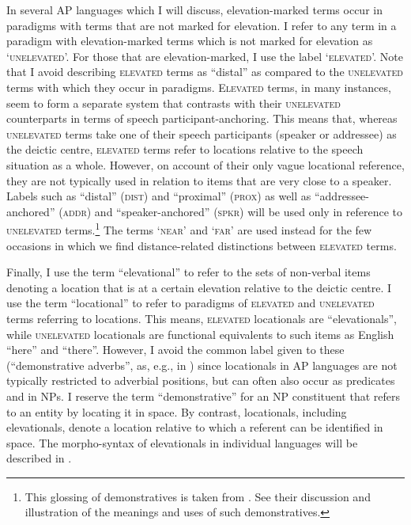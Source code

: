 In several AP languages which I will discuss, elevation-marked terms occur in paradigms with terms that are not marked for elevation. I refer to any term in a paradigm with elevation-marked terms which is not marked for elevation as `\textsc{unelevated}'. For those that are elevation-marked, I use the label `\textsc{elevated'.} Note that I avoid describing \textsc{elevated} terms as ``distal'' as compared to the \textsc{unelevated} terms with which they occur in paradigms. \textsc{Elevated} terms, in many instances, seem to form a separate system that contrasts with their \textsc{unelevated} counterparts in terms of speech participant-anchoring. This means that, whereas \textsc{unelevated} terms take one of their speech participants (speaker or addressee) as the deictic centre, \textsc{elevated} terms refer to locations relative to the speech situation as a whole. However, on account of their only vague locational reference, they are not typically used in relation to items that are very close to a speaker. Labels such as ``distal'' (\textsc{dist}) and ``proximal'' (\textsc{prox}) as well as ``addressee-anchored'' (\textsc{addr)} and ``speaker-anchored'' (\textsc{spkr)} will be used only in reference to \textsc{unelevated} terms.\footnote{This glossing of demonstratives is taken from  \citet{SchapperEtAl2011demnom}. See their discussion and illustration of the meanings and uses of such demonstratives.} The terms `\textsc{near}' and `\textsc{far'} are used instead for the few occasions in which we find distance-related distinctions between \textsc{elevated} terms.

Finally, I use the term ``elevational'' to refer to the sets of non-verbal items denoting a location that is at a certain elevation relative to the deictic centre. I use the term ``locational'' to refer to paradigms of \textsc{elevated} and \textsc{unelevated} terms referring to locations. This means, \textsc{elevated} locationals are ``elevationals'', while \textsc{unelevated} locationals are functional equivalents to such items as English ``here'' and ``there''. However, I avoid the common label given to these (``demonstrative adverbs'', as, e.g., in \citealt{Diessel1999}) since locationals in AP languages are not typically restricted to adverbial positions, but can often also occur as predicates and in NPs. I reserve the term ``demonstrative'' for an NP constituent that refers to an entity by locating it in space. By contrast, locationals, including elevationals, denote a location relative to which a referent can be identified in space. The morpho-syntax of elevationals in individual languages will be described in .

